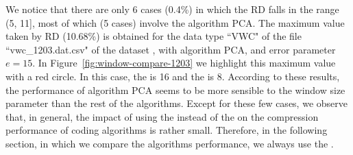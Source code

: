 We notice that there are only 6 cases (0.4\%) in which the RD falls in the range (5, 11], most of which (5 cases) involve the algorithm PCA. The maximum value taken by RD (10.68\%) is obtained for the data type ``VWC" of the file ``vwc\_1203.dat.csv" of the dataset \datasetsst, with algorithm PCA, and error parameter $e=15$. In Figure~\ref{fig:window-compare-1203} we highlight this maximum value with a red circle. In this case, the \ows is 16 and the \lows is 8. According to these results, the performance of algorithm PCA seems to be more sensible to the window size parameter than the rest of the algorithms. Except for these few cases, we observe that, in general, the impact of using the \ows instead of the \lows on the compression performance of coding algorithms is rather small. Therefore, in the following section, in which we compare the algorithms performance, we always use the \owsns.


\clearpage

